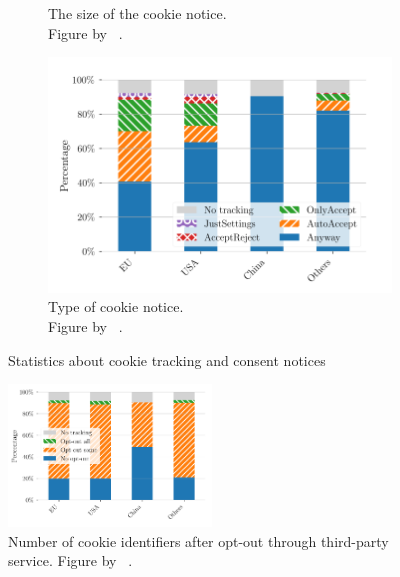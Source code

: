 \begin{figure}
\begin{subfigure}[b]{.5\textwidth}
        \caption{The size of the cookie notice.\\Figure by \citeauthor{sanchez2019can}~\cite[Fig.~2a]{sanchez2019can}.}
        \label{fig:notice_size}
    \end{subfigure}
    \begin{subfigure}[b]{.5\textwidth}
        \centering
        \includegraphics[width=\textwidth, scale=0.3]{figures/cookie_notice_type_trans.png}
        \caption{Type of cookie notice.\\Figure by \citeauthor{sanchez2019can}~\cite[Fig.~2b]{sanchez2019can}.}
        \label{fig:notice_type}
    \end{subfigure}
    \caption{Statistics about cookie tracking and consent notices}
    \label{fig:cookie_stats}
\end{figure}

\begin{figure}
    \centering
    \includegraphics[width=0.48\textwidth, scale=0.1]{figures/third_party_trans.png}
    \caption{Number of cookie identifiers after opt-out through third-party service. Figure by
    \citeauthor{sanchez2019can}~\cite[Fig.~2b]{sanchez2019can}.}
    \label{fig:third_party}
\end{figure}


